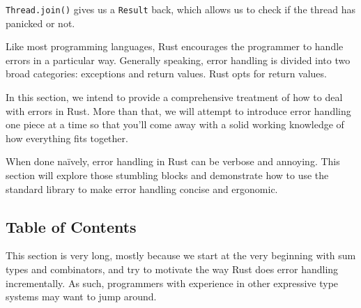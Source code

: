 \documentclass[a4paper,]{book}
\begin{document}
\texttt{Thread.join()} gives us a \texttt{Result} back, which allows us
to check if the thread has panicked or not.


Like most programming languages, Rust encourages the programmer to
handle errors in a particular way. Generally speaking, error handling is
divided into two broad categories: exceptions and return values. Rust
opts for return values.

In this section, we intend to provide a comprehensive treatment of how
to deal with errors in Rust. More than that, we will attempt to
introduce error handling one piece at a time so that you'll come away
with a solid working knowledge of how everything fits together.

When done naïvely, error handling in Rust can be verbose and annoying.
This section will explore those stumbling blocks and demonstrate how to
use the standard library to make error handling concise and ergonomic.

\subsection{Table of Contents}\label{table-of-contents}

This section is very long, mostly because we start at the very beginning
with sum types and combinators, and try to motivate the way Rust does
error handling incrementally. As such, programmers with experience in
other expressive type systems may want to jump around.
\end{document}
